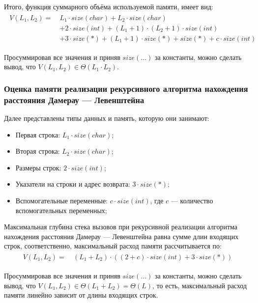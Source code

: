 Итого, функция суммарного объёма используемой памяти, имеет вид:
\begin{multline}
\begin{aligned}
V(L_1,L_2) =\ &L_1 \cdot size(char) + L_2 \cdot size(char) \\
&+ 2 \cdot size(int) + (L_1 + 1) \cdot (L_2 + 1) \cdot size(int) \\
&+ 3 \cdot size(*) + (L_1 + 1) \cdot size(*) + size(*) + c \cdot size(int)
\end{aligned}
\end{multline}

Просуммировав все значения и приняв $size(\dots)$ за константы, можно сделать вывод, что $V(L_1,L_2) \in \Theta(L_1 \cdot L_2)$.

\subsubsection{Оценка памяти реализации рекурсивного алгоритма нахождения расстояния Дамерау --- Левенштейна}
Далее представлены типы данных и память, которую они занимают:
\begin{itemize}
    \item Первая строка: $L_1 \cdot size(char)$;
    \item Вторая строка: $L_2 \cdot size(char)$;
    \item Размеры строк: $2 \cdot size(int)$;
    \item Указатели на строки и адрес возврата: $3 \cdot size(*)$;
    \item Вспомогательные переменные: $c \cdot size(int)$, где $c$ --- количество вспомогательных переменных;
\end{itemize}

Максимальная глубина стека вызовов при рекурсивной реализации алгоритма нахождения расстояния Дамерау --- Левенштейна равна сумме длин входящих строк, соответственно, максимальный расход памяти рассчитывается по:
\begin{multline}
\begin{aligned}
V(L_1,L_2) =\ &(L_1 + L_2) \cdot ((2 + c) \cdot size(int) + 3 \cdot size(*))
\end{aligned}
\end{multline}

Просуммировав все значения и приняв $size(\dots)$ за константы, можно сделать вывод, что $V(L_1,L_2) \in \Theta(L_1 + L_2) = \Theta(L)$, то есть, максимальный расход памяти линейно зависит от длины входящих строк.

